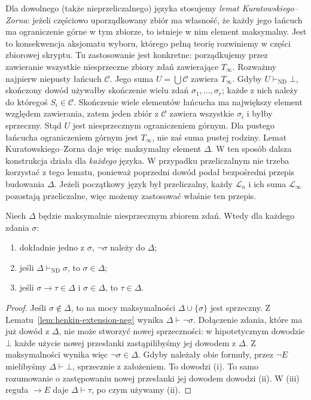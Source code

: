 \begin{uwaga}\label{rem:henkin-zorn}
Dla dowolnego (także nieprzeliczalnego) języka stosujemy \emph{lemat Kuratowskiego--Zorna}: jeżeli częściowo uporządkowany zbiór ma własność, że każdy jego łańcuch ma ograniczenie górne w tym zbiorze, to istnieje w nim element maksymalny. Jest to konsekwencja aksjomatu wyboru, którego pełną teorię rozwiniemy w części zbiorowej skryptu. Tu zastosowanie jest konkretne: porządkujemy przez zawieranie wszystkie niesprzeczne zbiory zdań zawierające $T_{\infty}$. Rozważmy najpierw niepusty łańcuch $\mathcal C$. Jego suma $U=\bigcup\mathcal C$ zawiera $T_{\infty}$. Gdyby $U\vdash_{\mathrm{ND}}\bot$, skończony dowód używałby skończenie wielu zdań $\sigma_1,\ldots,\sigma_r$; każde z nich należy do któregoś $S_i\in\mathcal C$. Skończenie wiele elementów łańcucha ma największy element względem zawierania, zatem jeden zbiór z $\mathcal C$ zawiera wszystkie $\sigma_i$ i byłby sprzeczny. Stąd $U$ jest niesprzecznym ograniczeniem górnym. Dla pustego łańcucha ograniczeniem górnym jest $T_{\infty}$, nie zaś suma pustej rodziny. Lemat Kuratowskiego--Zorna daje więc maksymalny element $\Delta$. W ten sposób dalsza konstrukcja działa dla \emph{każdego} języka. W przypadku przeliczalnym nie trzeba korzystać z tego lematu, ponieważ poprzedni dowód podał bezpośredni przepis budowania $\Delta$. Jeżeli początkowy język był przeliczalny, każdy $\mathcal L_n$ i ich suma $\mathcal L_{\infty}$ pozostają przeliczalne, więc możemy zastosować właśnie ten przepis.
\end{uwaga}

\begin{lemat}\label{lem:henkin-max-properties}
Niech $\Delta$ będzie maksymalnie niesprzecznym zbiorem zdań. Wtedy dla każdego zdania $\sigma$:
\begin{enumerate}[label=(\roman*)]
\item dokładnie jedno z $\sigma$, $\neg\sigma$ należy do $\Delta$;
\item jeśli $\Delta\vdash_{\mathrm{ND}}\sigma$, to $\sigma\in\Delta$;
\item jeśli $\sigma\to\tau\in\Delta$ i $\sigma\in\Delta$, to $\tau\in\Delta$.
\end{enumerate}
\end{lemat}
\begin{proof}
Jeśli $\sigma\notin\Delta$, to na mocy maksymalności $\Delta\cup\{\sigma\}$ jest sprzeczny. Z Lematu~\ref{lem:henkin-extension-neg} wynika $\Delta\vdash\neg\sigma$. Dołączenie zdania, które ma już dowód z $\Delta$, nie może stworzyć nowej sprzeczności: w hipotetycznym dowodzie $\bot$ każde użycie nowej przesłanki zastąpilibyśmy jej dowodem z $\Delta$. Z maksymalności wynika więc $\neg\sigma\in\Delta$. Gdyby należały obie formuły, przez $\neg E$ mielibyśmy $\Delta\vdash\bot$, sprzecznie z założeniem. To dowodzi (i). To samo rozumowanie o zastępowaniu nowej przesłanki jej dowodem dowodzi (ii). W (iii) reguła $\to E$ daje $\Delta\vdash\tau$, po czym używamy (ii).
\end{proof}


